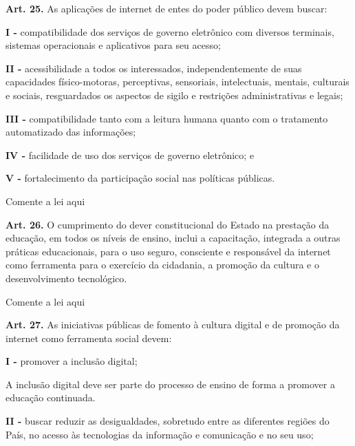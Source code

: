 
\noindent\textbf{Art. 25.} As aplicações de internet de entes do poder público devem buscar:

\noindent\textbf{I -} compatibilidade dos serviços de governo eletrônico com diversos terminais, sistemas operacionais e aplicativos para seu acesso;

\noindent\textbf{II -} acessibilidade a todos os interessados, independentemente de suas capacidades físico-motoras, perceptivas, sensoriais, intelectuais, mentais, culturais e sociais, resguardados os aspectos de sigilo e restrições administrativas e legais;

\noindent\textbf{III -} compatibilidade tanto com a leitura humana quanto com o tratamento automatizado das informações;

\noindent\textbf{IV -} facilidade de uso dos serviços de governo eletrônico; e

\noindent\textbf{V -} fortalecimento da participação social nas políticas públicas.

\begin{displayquote}
Comente a lei aqui  
\end{displayquote}


\noindent\textbf{Art. 26.} O cumprimento do dever constitucional do Estado na prestação da educação, em todos os níveis de ensino, inclui a capacitação, integrada a outras práticas educacionais, para o uso seguro, consciente e responsável da internet como ferramenta para o exercício da cidadania, a promoção da cultura e o desenvolvimento tecnológico.

\begin{displayquote}
Comente a lei aqui  
\end{displayquote}


\noindent\textbf{Art. 27.} As iniciativas públicas de fomento à cultura digital e de promoção da internet como ferramenta social devem:

\noindent\textbf{I -} promover a inclusão digital;    

\begin{displayquote}
     A inclusão digital deve ser parte do processo de ensino de forma a promover a educação continuada.
\end{displayquote}

\noindent\textbf{II -} buscar reduzir as desigualdades, sobretudo entre as diferentes regiões do País, no acesso às tecnologias da informação e comunicação e no seu uso;

